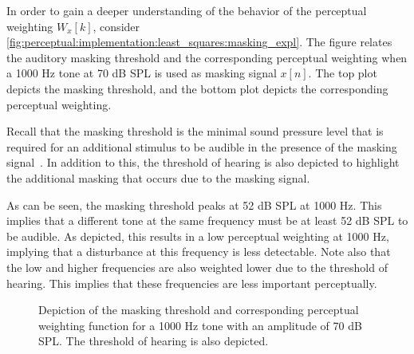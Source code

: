 In order to gain a deeper understanding of the behavior of the perceptual weighting $W_x[k]$, consider 
\autoref{fig:perceptual:implementation:least_squares:masking_expl}.
The figure relates the auditory masking threshold and the corresponding perceptual weighting when a 1000 Hz tone at 70 dB SPL is used as masking signal $x[n]$.
The top plot depicts the masking threshold, and the bottom plot depicts the corresponding perceptual weighting.

Recall that the masking threshold is the minimal sound pressure level that is required for an additional stimulus to be audible in the presence of the masking signal~\cite{painter2000perceptual}.
In addition to this, the threshold of hearing is also depicted to highlight the additional masking that occurs due to the masking signal.

As can be seen, the masking threshold peaks at 52 dB SPL at 1000 Hz.
This implies that a different tone at the same frequency must be at least 52 dB SPL to be audible.
As depicted, this results in a low perceptual weighting at 1000 Hz, implying that a disturbance at this frequency is less detectable.
Note also that the low and higher frequencies are also weighted lower due to the threshold of hearing.
This implies that these frequencies are less important perceptually.

\begin{figure}[]
    \centering
    \scalebox{1.0}{}
    \caption{Depiction of the masking threshold and corresponding perceptual weighting 
        function for a 1000 Hz tone with an amplitude of 70 dB SPL.
        The threshold of hearing is also depicted.}
    \label{fig:perceptual:implementation:least_squares:masking_expl}
\end{figure}
